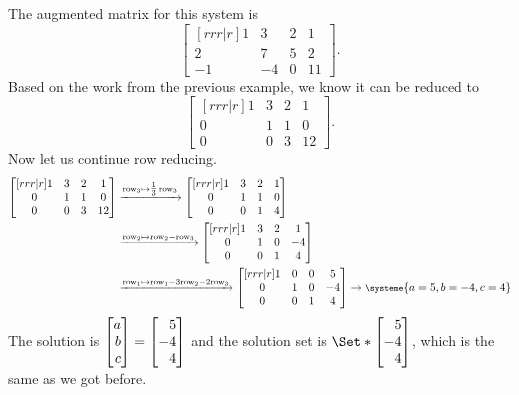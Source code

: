 \begin{example}
		The augmented matrix for this system is
		\[
			\begin{bmatrix}[rrr|r]
				1&3&2 & 1\\
				2&7&5 & 2\\
				-1&-4&0 & 11
			\end{bmatrix}.
		\]
		Based on the work from the previous example, we know it can be reduced to
		\[
			\begin{bmatrix}[rrr|r]
				1&3&2 & 1\\
				0&1&1 & 0\\
				0&0&3 & 12
			\end{bmatrix}.
		\]
		Now let us continue row reducing.
		\begin{align*}
			\begin{bmatrix}[rrr|r]
				1&3&2 & 1\\
				0&1&1 & 0\\
				0&0&3 & 12
			\end{bmatrix}
			&\xrightarrow{\text{row}_3\mapsto\tfrac{1}{3}\,\text{row}_3}
			\begin{bmatrix}[rrr|r]
				1&3&2 & 1\\
				0&1&1 & 0\\
				0&0&1 & 4
			\end{bmatrix}\\
			&\xrightarrow{\text{row}_2\mapsto\text{row}_2-\text{row}_3}
			\begin{bmatrix}[rrr|r]
				1&3&2 & 1\\
				0&1&0 & -4\\
				0&0&1 & 4
			\end{bmatrix}\\
			&\xrightarrow{\text{row}_1\mapsto\text{row}_1-3\text{row}_2-2\text{row}_3}
			\begin{bmatrix}[rrr|r]
				1&0&0 & 5\\
				0&1&0 & -4\\
				0&0&1 & 4
			\end{bmatrix}
			\rightarrow
			{\footnotesize
				\systeme{
				a=5,
				b=-4,
				c=4
				}
			}
		\end{align*}
		The solution is $\mat{a\\b\\c}=\mat{5\\-4\\4}$ and the solution set is $\Set*{\mat{5\\-4\\4}}$, which is the same as we got before.
	\end{example}

